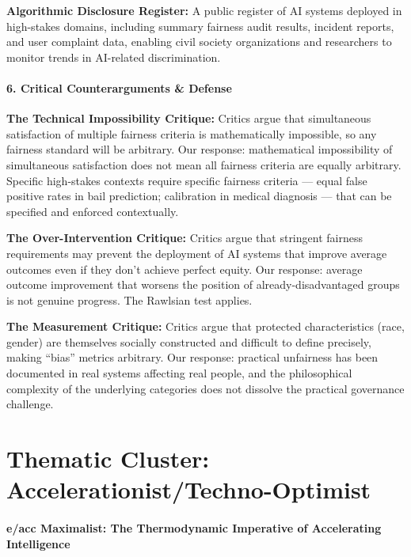 \textbf{Algorithmic Disclosure Register:} A public register of AI
systems deployed in high-stakes domains, including summary fairness
audit results, incident reports, and user complaint data, enabling civil
society organizations and researchers to monitor trends in AI-related
discrimination.

\paragraph{6. Critical Counterarguments \&
Defense}\label{critical-counterarguments-defense-10}

\textbf{The Technical Impossibility Critique:} Critics argue that
simultaneous satisfaction of multiple fairness criteria is
mathematically impossible, so any fairness standard will be arbitrary.
Our response: mathematical impossibility of simultaneous satisfaction
does not mean all fairness criteria are equally arbitrary. Specific
high-stakes contexts require specific fairness criteria --- equal false
positive rates in bail prediction; calibration in medical diagnosis ---
that can be specified and enforced contextually.

\textbf{The Over-Intervention Critique:} Critics argue that stringent
fairness requirements may prevent the deployment of AI systems that
improve average outcomes even if they don't achieve perfect equity. Our
response: average outcome improvement that worsens the position of
already-disadvantaged groups is not genuine progress. The Rawlsian test
applies.

\textbf{The Measurement Critique:} Critics argue that protected
characteristics (race, gender) are themselves socially constructed and
difficult to define precisely, making ``bias'' metrics arbitrary. Our
response: practical unfairness has been documented in real systems
affecting real people, and the philosophical complexity of the
underlying categories does not dissolve the practical governance
challenge.

\section{Thematic Cluster:
Accelerationist/Techno-Optimist}\label{thematic-cluster-accelerationisttechno-optimist}

\paragraph{e/acc Maximalist: The Thermodynamic Imperative of
Accelerating
Intelligence}\label{eacc-maximalist-the-thermodynamic-imperative-of-accelerating-intelligence}

